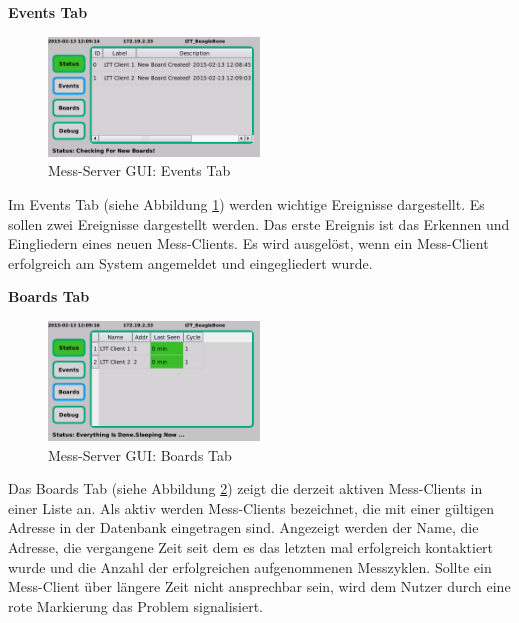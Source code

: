 \textbf{Events Tab}

\begin{figure}[H]
\begin{center}
\includegraphics[width=0.5\textwidth ]{img/GUI/Server_GUI_Events1.png}
\caption{Mess-Server GUI: Events Tab}
\label{figure_MessServerGUIEvents}
\end{center}
\end{figure}

Im Events Tab (siehe Abbildung \ref{figure_MessServerGUIEvents}) werden wichtige Ereignisse dargestellt. Es sollen zwei Ereignisse dargestellt werden. Das erste Ereignis ist das Erkennen und Eingliedern eines neuen Mess-Clients. Es wird ausgelöst, wenn ein Mess-Client erfolgreich am System angemeldet und eingegliedert wurde. 

\textbf{Boards Tab}

\begin{figure}[H]
\begin{center}
\includegraphics[width=0.5\textwidth ]{img/GUI/Server_GUI_Boards1.png}
\caption{Mess-Server GUI: Boards Tab}
\label{figure_MessServerGUIBoards}
\end{center}
\end{figure}

Das Boards Tab (siehe Abbildung \ref{figure_MessServerGUIBoards}) zeigt die derzeit aktiven Mess-Clients in einer Liste an. Als aktiv werden Mess-Clients bezeichnet, die mit einer gültigen Adresse in der Datenbank eingetragen sind. Angezeigt werden der Name, die Adresse, die vergangene Zeit seit dem es das letzten mal erfolgreich kontaktiert wurde und die Anzahl der erfolgreichen aufgenommenen Messzyklen. Sollte ein Mess-Client über längere Zeit nicht ansprechbar sein, wird dem Nutzer durch eine rote Markierung das Problem signalisiert.

